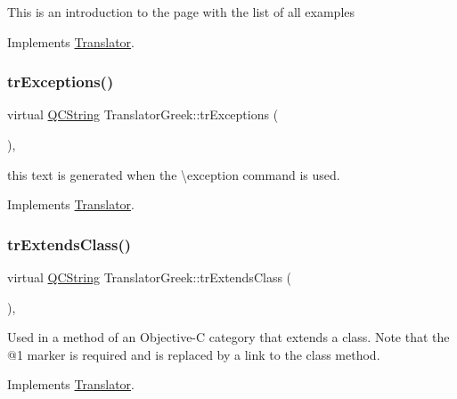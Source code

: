 This is an introduction to the page with the list of all examples 

Implements \mbox{\hyperlink{class_translator}{Translator}}.

\mbox{\label{class_translator_greek_a5eef51c517972bf9585fb4b6cbd6998f}} 
\subsubsection{\texorpdfstring{trExceptions()}{trExceptions()}}
{\footnotesize\ttfamily virtual \mbox{\hyperlink{class_q_c_string}{Q\+C\+String}} Translator\+Greek\+::tr\+Exceptions (\begin{DoxyParamCaption}{ }\end{DoxyParamCaption})\hspace{0.3cm}{\ttfamily [inline]}, {\ttfamily [virtual]}}

this text is generated when the \textbackslash{}exception command is used. 

Implements \mbox{\hyperlink{class_translator}{Translator}}.

\mbox{\label{class_translator_greek_aeeaee16fc9fbd829814d61445bc042e6}} 
\subsubsection{\texorpdfstring{trExtendsClass()}{trExtendsClass()}}
{\footnotesize\ttfamily virtual \mbox{\hyperlink{class_q_c_string}{Q\+C\+String}} Translator\+Greek\+::tr\+Extends\+Class (\begin{DoxyParamCaption}{ }\end{DoxyParamCaption})\hspace{0.3cm}{\ttfamily [inline]}, {\ttfamily [virtual]}}

Used in a method of an Objective-\/C category that extends a class. Note that the @1 marker is required and is replaced by a link to the class method. 

Implements \mbox{\hyperlink{class_translator}{Translator}}.

\mbox{\label{class_translator_greek_ad17af66495dad72776b8105237b5ed7b}} 
